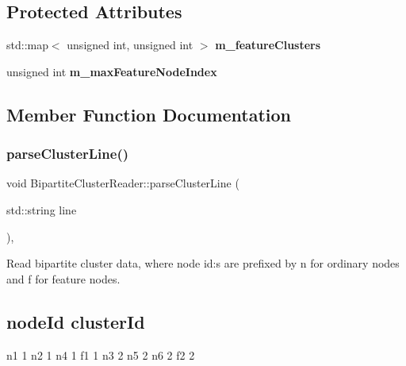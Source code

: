 \subsection*{Protected Attributes}
\begin{DoxyCompactItemize}
\item 
\mbox{\label{classBipartiteClusterReader_aec090dd89587acf40e59abd7b7d74f80}} 
std\+::map$<$ unsigned int, unsigned int $>$ {\bfseries m\+\_\+feature\+Clusters}
\item 
\mbox{\label{classBipartiteClusterReader_a2c45834c7e1df4394b7be03648276e09}} 
unsigned int {\bfseries m\+\_\+max\+Feature\+Node\+Index}
\end{DoxyCompactItemize}


\subsection{Member Function Documentation}
\mbox{\label{classBipartiteClusterReader_a1766b76de634ba4f50695b427a4ec446}} 
\subsubsection{\texorpdfstring{parse\+Cluster\+Line()}{parseClusterLine()}}
{\footnotesize\ttfamily void Bipartite\+Cluster\+Reader\+::parse\+Cluster\+Line (\begin{DoxyParamCaption}\item[{std\+::string}]{line }\end{DoxyParamCaption})\hspace{0.3cm}{\ttfamily [protected]}, {\ttfamily [virtual]}}

Read bipartite cluster data, where node id\+:s are prefixed by \textquotesingle{}n\textquotesingle{} for ordinary nodes and \textquotesingle{}f\textquotesingle{} for feature nodes.

\subsection*{node\+Id cluster\+Id}

n1 1 n2 1 n4 1 f1 1 n3 2 n5 2 n6 2 f2 2 

